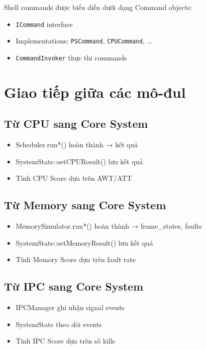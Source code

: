 Shell commands được biểu diễn dưới dạng Command objects:

\begin{itemize}[leftmargin=1.5cm]
  \item \texttt{ICommand} interface
  \item Implementations: \texttt{PSCommand}, \texttt{CPUCommand}, ...
  \item \texttt{CommandInvoker} thực thi commands
\end{itemize}

\section{Giao tiếp giữa các mô-đul}

\subsection{Từ CPU sang Core System}

\begin{itemize}[leftmargin=1.5cm]
  \item Scheduler.run*() hoàn thành → kết quả
  \item SystemState::setCPUResult() lưu kết quả
  \item Tính CPU Score dựa trên AWT/ATT
\end{itemize}

\subsection{Từ Memory sang Core System}

\begin{itemize}[leftmargin=1.5cm]
  \item MemorySimulator.run*() hoàn thành → frame\_states, faults
  \item SystemState::setMemoryResult() lưu kết quả
  \item Tính Memory Score dựa trên fault rate
\end{itemize}

\subsection{Từ IPC sang Core System}

\begin{itemize}[leftmargin=1.5cm]
  \item IPCManager ghi nhận signal events
  \item SystemState theo dõi events
  \item Tính IPC Score dựa trên số kills
\end{itemize}

